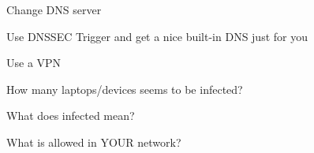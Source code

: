 \documentclass[20pt,landscape,a4paper,footrule]{foils}
\begin{document}

\begin{list2}
\item Change DNS server\\
\item Use DNSSEC Trigger and get a nice built-in DNS just for you\\ 
\item Use a VPN
\end{list2}


\begin{list2}
\item How many laptops/devices seems to be infected?
\item What does infected mean?
\item What is allowed in YOUR network?
\end{list2}




\myquestionspage
\end{document}
